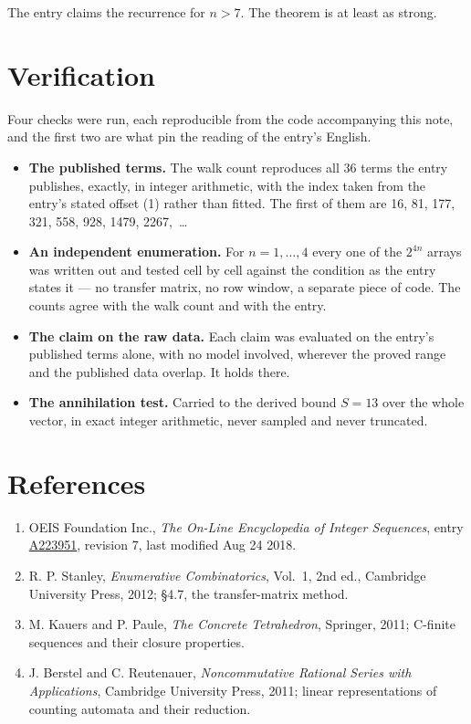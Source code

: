 \documentclass[11pt]{article}
\theoremstyle{definition}
\begin{document}
The entry claims the recurrence for $n > 7$. The theorem is at least as strong.

\section{Verification}

Four checks were run, each reproducible from the code accompanying this note, and the first two are what pin the reading of the entry's English.

\begin{itemize}

\item {\bfseries The published terms.} The walk count reproduces all 36 terms the entry publishes, exactly, in integer arithmetic, with the index taken from the entry's stated offset (1) rather than fitted. The first of them are 16, 81, 177, 321, 558, 928, 1479, 2267,~\dots

\item {\bfseries An independent enumeration.} For $n = 1,\dots,4$ every one of the $2^{4n}$ arrays was written out and tested cell by cell against the condition as the entry states it --- no transfer matrix, no row window, a separate piece of code. The counts agree with the walk count and with the entry.

\item {\bfseries The claim on the raw data.} Each claim was evaluated on the entry's published terms alone, with no model involved, wherever the proved range and the published data overlap. It holds there.

\item {\bfseries The annihilation test.} Carried to the derived bound $S = 13$ over the whole vector, in exact integer arithmetic, never sampled and never truncated.

\end{itemize}

\section{References}

\begin{enumerate}

\item OEIS Foundation Inc., \emph{The On-Line Encyclopedia of Integer Sequences}, entry \href{https://oeis.org/A223951}{A223951}, revision 7, last modified Aug 24 2018.

\item R. P. Stanley, \emph{Enumerative Combinatorics}, Vol.~1, 2nd ed., Cambridge University Press, 2012; \S4.7, the transfer-matrix method.

\item M. Kauers and P. Paule, \emph{The Concrete Tetrahedron}, Springer, 2011; C-finite sequences and their closure properties.

\item J. Berstel and C. Reutenauer, \emph{Noncommutative Rational Series with Applications}, Cambridge University Press, 2011; linear representations of counting automata and their reduction.

\end{enumerate}
\end{document}
